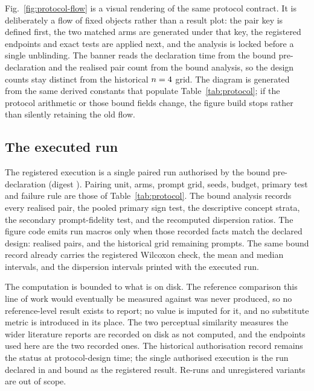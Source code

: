 Fig.~\ref{fig:protocol-flow} is a visual rendering of the same protocol
contract. It is deliberately a flow of fixed objects rather than a result
plot: the pair key is defined first, the two matched arms are generated under
that key, the registered endpoints and exact tests are applied next, and the
analysis is locked before a single unblinding. The banner reads the
declaration time from the bound pre-declaration and the realised pair count
from the bound analysis, so the design counts stay distinct from the
historical \(n=4{}\) grid. The diagram is generated from the same
derived constants that populate Table~\ref{tab:protocol}; if the protocol
arithmetic or those bound fields change, the figure build stops rather than
silently retaining the old flow.

\subsection{The executed run}

The registered execution is a single paired run authorised by the bound
pre-declaration (digest \PredeclarationShaShort{}). Pairing unit, arms,
prompt grid, seeds, budget, primary test and failure rule are those of
Table~\ref{tab:protocol}. The bound analysis records every realised pair, the
pooled primary sign test, the descriptive concept strata, the secondary
prompt-fidelity test, and the recomputed dispersion ratios. The figure code
emits run macros only when those recorded facts match the declared design:
\RunPairs{} realised pairs, and the historical grid remaining \NPairs{}
prompts. The same bound record already carries the registered Wilcoxon
check, the mean and median intervals, and the dispersion intervals printed
with the executed run.

The computation is bounded to what is on disk. The reference comparison this
line of work would eventually be measured against was never produced, so no
reference-level result exists to report; no value is imputed for it, and no
substitute metric is introduced in its place. The two perceptual similarity
measures the wider literature reports are recorded on disk as not computed,
and the endpoints used here are the two recorded ones. The historical
authorisation record remains the status at protocol-design time; the single
authorised execution is the run declared in \PredeclarationShaShort{} and
bound as the registered result. Re-runs and unregistered variants are out of
scope.
